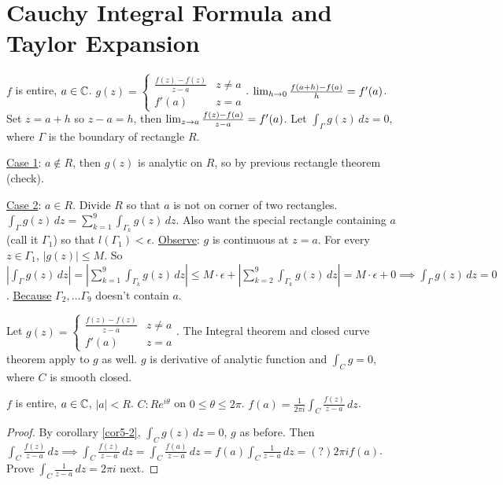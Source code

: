 \documentclass[]{article}
\begin{document}
\section{Cauchy Integral Formula and Taylor Expansion}
\begin{theorem}
	 $f$ is entire, $a\in\mathbb{C}$. $g(z) = \begin{cases} \frac{f(z) - f(z)}{z-a} & z\neq a \\ f'(a) & z=a \end{cases}$. $\lim_{h\rightarrow 0} \frac{f(a+h) -f(a)}{h} = f'(a)$. Set $z=a+h$ so $z-a=h$, then $\lim_{z\rightarrow a} \frac{f(z)-f(a)}{z-a} = f'(a)$. Let $\int_{\Gamma} g(z) \, dz = 0$, where $\Gamma$ is the boundary of rectangle $R$.
	
	\underline{Case 1}: $a\notin R$, then $g(z)$ is analytic on $R$, so by previous rectangle theorem (check).
	
	\underline{Case 2}: $a\in R$. Divide $R$ so that $a$ is not on corner of two rectangles. $\int_{\Gamma} g(z) \, dz = \sum_{k=1}^9 \int_{\Gamma_k} g(z) \, dz$. Also want the special rectangle containing $a$ (call it $\Gamma_1$) so that $l(\Gamma_1) < \epsilon$. \underline{Observe}: $g$ is continuous at $z=a$. For every $z\in \Gamma_1$, $|g(z)| \leq M$. So $\left| \int_{\Gamma} g(z) \, dz \right| = \left| \sum_{k=1}^9 \int_{\Gamma_k} g(z) \, dz \right| \leq M\cdot \epsilon + \left| \sum_{k=2}^9 \int_{\Gamma_k} g(z) \, dz \right| = M\cdot \epsilon + 0 \implies \int_{\Gamma} g(z) \, dz = 0$. \underline{Because} $\Gamma_2, \dots \Gamma_9$ doesn't contain $a$.%
\end{theorem}
\begin{corollary}
	Let $g(z) = \begin{cases} \frac{f(z) - f(z)}{z-a} & z\neq a \\ f'(a) & z=a \end{cases}$. The Integral theorem and closed curve theorem apply to $g$ as well. $g$ is derivative of analytic function and $\int_C g = 0$, where $C$ is smooth closed.
	\label{cor5-2}
\end{corollary}
\begin{proposition}
	 $f$ is entire, $a\in\mathbb{C}$, $|a|<R$. $C: Re^{i\theta}$ on $0\leq \theta\leq 2\pi$. $f(a) = \frac{1}{2\pi i} \int_C \frac{f(z)}{z-a} \, dz$.
\end{proposition}
\begin{proof}
	By corollary \ref{cor5-2}, $\int_C g(z) \, dz = 0$, $g$ as before. Then $\int_C \frac{f(z)}{z-a} \, dz \implies \int_C \frac{f(z)}{z-a} \, dz = \int_C \frac{f(a)}{z-a} \, dz = f(a) \int_C \frac{1}{z-a} \, dz =(?) 2\pi i f(a)$. Prove $\int_C \frac{1}{z-a} \, dz = 2\pi i$ next.
\end{proof}
\end{document}
